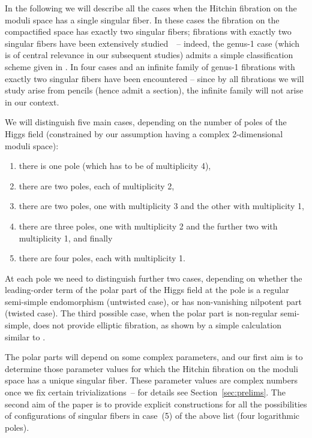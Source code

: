 \documentclass[pdftex]{sigma}
\numberwithin{equation}{section}
\begin{document}
In the following we will describe all the cases
when the Hitchin fibration on the moduli space has a single singular
fiber. In these cases the fibration on the compactified space has
exactly two singular fibers; fibrations with exactly two singular
fibers have been extensively studied~\cite{TwoSing1, TwoSing3}~--
indeed, the genus-1 case (which is of central relevance in our
subsequent studies) admits a simple classification scheme given in
\cite[Theorem~3.2]{TwoSing3}. In \cite[Theorem~3.2]{TwoSing3} four
cases and an infinite family of genus-1 fibrations with exactly two
singular fibers have been encountered -- since by
\cite[Section~4]{Sz-spectral} all fibrations we will study arise from
pencils (hence admit a section), the infinite family will not arise in
our context.

We will distinguish five main cases, depending on the number of poles
of the Higgs field (constrained by our assumption having a complex
2-dimensional moduli space):
\begin{enumerate}\itemsep=0pt
\item[1)] there is one pole (which has to be of multiplicity 4),
\item[2)] there are two poles, each of multiplicity 2,
\item[3)] there are two poles, one with multiplicity 3 and the other with
multiplicity 1,
\item[4)] there are three poles, one with multiplicity 2 and the further two with multiplicity 1, and finally
\item[5)] there are four poles, each with multiplicity 1. %
\end{enumerate}
At each pole we need to distinguish further two cases, depending on
whether the leading-order term of the polar part of the Higgs field at
the pole is a regular semi-simple endomorphism (untwisted case), or
has non-vanishing nilpotent part (twisted case). {The third
 possible case, when the polar part is non-regular semi-simple, does
 not provide elliptic fibration, as shown by a simple
 calculation similar to \cite[Lemma~5.6]{ISS2}.}

The polar parts will depend on some complex parameters, and our {first} aim is
to determine those parameter values for which the Hitchin fibration on
the moduli space has a unique singular fiber. These parameter values
are complex numbers once we fix certain trivializations~-- for
details see Section~\ref{sec:prelims}.
The second aim of the paper is to provide explicit constructions for all the
possibilities of configurations of singular fibers in case~(5) of
the above list (four logarithmic poles).
\end{document}
